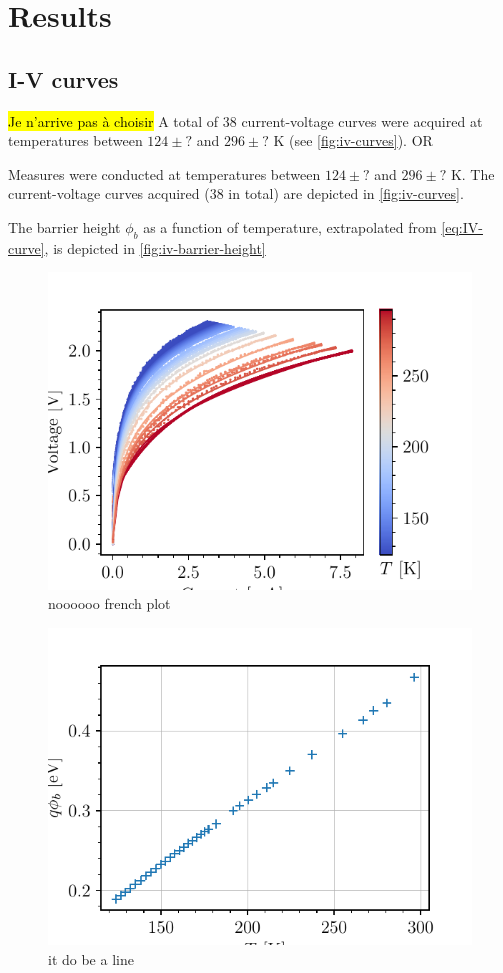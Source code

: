 \section{Results}
\subsection{I-V curves}
\hl{Je n'arrive pas à choisir} 
A total of 38 current-voltage curves were acquired at temperatures between $124 \pm ?$ and $296\pm?$ K (see \autoref{fig:iv-curves}). OR

Measures were conducted at temperatures between $124 \pm ?$ and $296\pm?$ K. 
The current-voltage curves acquired (38 in total) are depicted in \autoref{fig:iv-curves}.

The barrier height $\phi_b$ as a function of temperature, extrapolated from \autoref{eq:IV-curve}, is depicted in \autoref{fig:iv-barrier-height}

\begin{figure}[htbp]
    \centering
    \includegraphics[scale=1]{figures/iv-curves.pdf}
    \caption{noooooo french plot}
    \label{fig:iv-curves}
\end{figure}

\begin{figure}[htbp]
    \centering
    \includegraphics[scale=1]{figures/iv-schottky-potential-temperature.pdf}
    \caption{it do be a line}
    \label{fig:iv-barrier-height}
\end{figure}
